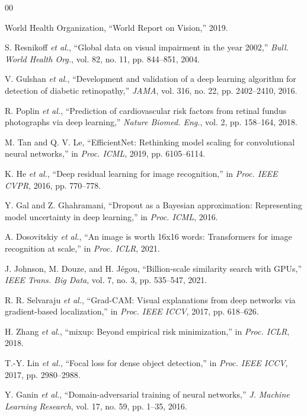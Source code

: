 \documentclass[conference]{IEEEtran}
\begin{document}
\begin{thebibliography}{00}

World Health Organization, ``World Report on Vision,'' 2019.

S. Resnikoff \textit{et al.}, ``Global data on visual impairment in the year 2002,'' \textit{Bull. World Health Org.}, vol. 82, no. 11, pp. 844--851, 2004.

V. Gulshan \textit{et al.}, ``Development and validation of a deep learning algorithm for detection of diabetic retinopathy,'' \textit{JAMA}, vol. 316, no. 22, pp. 2402--2410, 2016.

R. Poplin \textit{et al.}, ``Prediction of cardiovascular risk factors from retinal fundus photographs via deep learning,'' \textit{Nature Biomed. Eng.}, vol. 2, pp. 158--164, 2018.

M. Tan and Q. V. Le, ``EfficientNet: Rethinking model scaling for convolutional neural networks,'' in \textit{Proc. ICML}, 2019, pp. 6105--6114.

K. He \textit{et al.}, ``Deep residual learning for image recognition,'' in \textit{Proc. IEEE CVPR}, 2016, pp. 770--778.

Y. Gal and Z. Ghahramani, ``Dropout as a Bayesian approximation: Representing model uncertainty in deep learning,'' in \textit{Proc. ICML}, 2016.

A. Dosovitskiy \textit{et al.}, ``An image is worth 16x16 words: Transformers for image recognition at scale,'' in \textit{Proc. ICLR}, 2021.

J. Johnson, M. Douze, and H. J\'{e}gou, ``Billion-scale similarity search with GPUs,'' \textit{IEEE Trans. Big Data}, vol. 7, no. 3, pp. 535--547, 2021.

R. R. Selvaraju \textit{et al.}, ``Grad-CAM: Visual explanations from deep networks via gradient-based localization,'' in \textit{Proc. IEEE ICCV}, 2017, pp. 618--626.

H. Zhang \textit{et al.}, ``mixup: Beyond empirical risk minimization,'' in \textit{Proc. ICLR}, 2018.

T.-Y. Lin \textit{et al.}, ``Focal loss for dense object detection,'' in \textit{Proc. IEEE ICCV}, 2017, pp. 2980--2988.

Y. Ganin \textit{et al.}, ``Domain-adversarial training of neural networks,'' \textit{J. Machine Learning Research}, vol. 17, no. 59, pp. 1--35, 2016.


\end{thebibliography}
\end{document}
